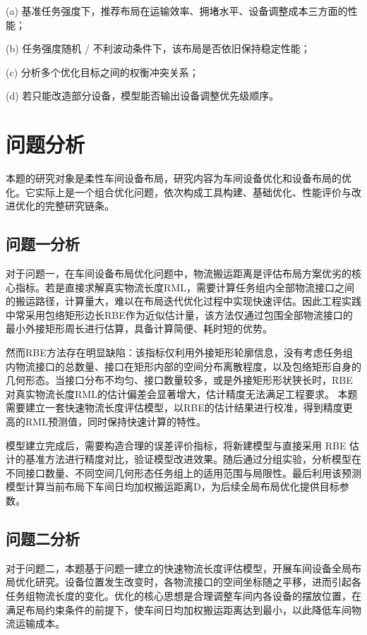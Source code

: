 \documentclass[12pt,a4paper]{article}
\begin{document}
	(a) 基准任务强度下，推荐布局在运输效率、拥堵水平、设备调整成本三方面的性能；
	
	(b) 任务强度随机 / 不利波动条件下，该布局是否依旧保持稳定性能；
	
	(c) 分析多个优化目标之间的权衡冲突关系；
	
	(d) 若只能改造部分设备，模型能否输出设备调整优先级顺序。
	\section{问题分析}

	本题的研究对象是柔性车间设备布局，研究内容为车间设备优化和设备布局的优化。它实际上是一个组合优化问题\cite{tian2026slp}，依次构成工具构建、基础优化、性能评价与改进优化的完整研究链条。
	
	\subsection{问题一分析}
	
	对于问题一，在车间设备布局优化问题中，物流搬运距离是评估布局方案优劣的核心指标。若是直接求解真实物流长度RML，需要计算任务组内全部物流接口之间的搬运路径，计算量大，难以在布局迭代优化过程中实现快速评估。因此工程实践中常采用包络矩形边长RBE作为近似估计量，该方法仅通过包围全部物流接口的最小外接矩形周长进行估算，具备计算简便、耗时短的优势。
	
	然而RBE方法存在明显缺陷：该指标仅利用外接矩形轮廓信息，没有考虑任务组内物流接口的总数量、接口在矩形内部的空间分布离散程度，以及包络矩形自身的几何形态。当接口分布不均匀、接口数量较多，或是外接矩形形状狭长时，RBE对真实物流长度RML的估计偏差会显著增大，估计精度无法满足工程要求。
	本题需要建立一套快速物流长度评估模型，以RBE的估计结果进行校准，得到精度更高的RML预测值，同时保持快速计算的特性。
	
	模型建立完成后，需要构造合理的误差评价指标，将新建模型与直接采用 RBE 估计的基准方法进行精度对比，验证模型改进效果。随后通过分组实验，分析模型在不同接口数量、不同空间几何形态任务组上的适用范围与局限性。最后利用该预测模型计算当前布局下车间日均加权搬运距离D，为后续全局布局优化提供目标参数。
	
	\subsection{问题二分析}
	
	对于问题二，本题基于问题一建立的快速物流长度评估模型，开展车间设备全局布局优化研究。设备位置发生改变时，各物流接口的空间坐标随之平移，进而引起各任务组物流长度的变化。优化的核心思想是合理调整车间内各设备的摆放位置，在满足布局约束条件的前提下，使车间日均加权搬运距离达到最小，以此降低车间物流运输成本。
	
\end{document}

